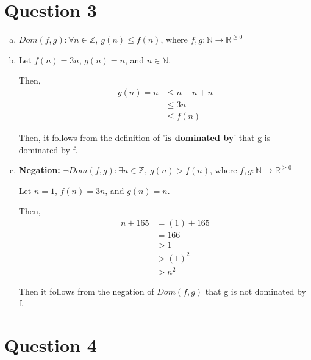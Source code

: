 \documentclass[12pt]{article}
\begin{document}
\section*{Question 3}
\begin{enumerate}[a.]
    \item

    $Dom(f,g): \forall n \in \mathbb{Z},\: g(n) \leq f(n)$, where $f,g: \mathbb{N}
    \to \mathbb{R}^{\geq 0}$

    \item

    Let $f(n) = 3n$, $g(n) = n$, and $n \in \mathbb{N}$.

    \bigskip

    Then,
    \setcounter{equation}{0}
    \begin{align}
        g(n) = n &\leq n + n + n\\
        &\leq 3n\\
        &\leq f(n)
    \end{align}

    Then, it follows from the definition of '\textbf{is dominated by}' that g is
    dominated by f.

    \item

    \textbf{Negation:} $\neg Dom(f,g): \exists n \in \mathbb{Z},\:g(n) > f(n)$, where
    $f,g: \mathbb{N} \to \mathbb{R}^{\geq 0}$

    \bigskip

    Let $n = 1$, $f(n) = 3n$, and $g(n) = n$.

    \bigskip

    Then,
    \setcounter{equation}{0}
    \begin{align}
        n + 165 &= (1) + 165\\
        &= 166\\
        &> 1\\
        &> (1)^2\\
        &> n^2
    \end{align}

    \bigskip

    Then it follows from the negation of $Dom(f,g)$ that g is not dominated by f.

\end{enumerate}

\section*{Question 4}
\end{document}
